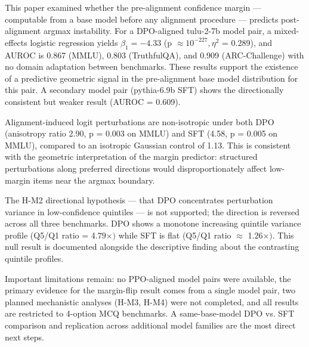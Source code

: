 
This paper examined whether the pre-alignment confidence margin --- computable from a base model before any alignment procedure --- predicts post-alignment argmax instability. For a DPO-aligned tulu-2-7b model pair, a mixed-effects logistic regression yields $\beta _1 = -4.33$ (p $\approx 10^{-227}, \eta^2$ = 0.289), and AUROC is 0.867 (MMLU), 0.803 (TruthfulQA), and 0.909 (ARC-Challenge) with no domain adaptation between benchmarks. These results support the existence of a predictive geometric signal in the pre-alignment base model distribution for this pair. A secondary model pair (pythia-6.9b SFT) shows the directionally consistent but weaker result (AUROC = 0.609).

Alignment-induced logit perturbations are non-isotropic under both DPO (anisotropy ratio 2.90, p = 0.003 on MMLU) and SFT (4.58, p = 0.005 on MMLU), compared to an isotropic Gaussian control of 1.13. This is consistent with the geometric interpretation of the margin predictor: structured perturbations along preferred directions would disproportionately affect low-margin items near the argmax boundary.

The H-M2 directional hypothesis --- that DPO concentrates perturbation variance in low-confidence quintiles --- is not supported; the direction is reversed across all three benchmarks. DPO shows a monotone increasing quintile variance profile (Q5/Q1 ratio = 4.$79\times )$ while SFT is flat (Q5/Q1 ratio $\approx$ 1.$26\times )$. This null result is documented alongside the descriptive finding about the contrasting quintile profiles.

Important limitations remain: no PPO-aligned model pairs were available, the primary evidence for the margin-flip result comes from a single model pair, two planned mechanistic analyses (H-M3, H-M4) were not completed, and all results are restricted to 4-option MCQ benchmarks. A same-base-model DPO vs. SFT comparison and replication across additional model families are the most direct next steps.

